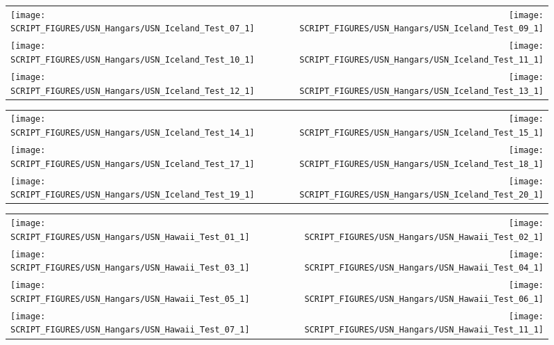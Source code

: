 \begin{figure}[!ht]
\begin{tabular*}{\textwidth}{l@{\extracolsep{\fill}}r}
\texttt{[image: SCRIPT\_FIGURES/USN\_Hangars/USN\_Iceland\_Test\_07\_1]} &
\texttt{[image: SCRIPT\_FIGURES/USN\_Hangars/USN\_Iceland\_Test\_09\_1]} \\
\texttt{[image: SCRIPT\_FIGURES/USN\_Hangars/USN\_Iceland\_Test\_10\_1]} &
\texttt{[image: SCRIPT\_FIGURES/USN\_Hangars/USN\_Iceland\_Test\_11\_1]} \\
\texttt{[image: SCRIPT\_FIGURES/USN\_Hangars/USN\_Iceland\_Test\_12\_1]} &
\texttt{[image: SCRIPT\_FIGURES/USN\_Hangars/USN\_Iceland\_Test\_13\_1]} \\
\end{tabular*}
\label{USN_Plume_Iceland_2}
\end{figure}

\begin{figure}[!ht]
\begin{tabular*}{\textwidth}{l@{\extracolsep{\fill}}r}
\texttt{[image: SCRIPT\_FIGURES/USN\_Hangars/USN\_Iceland\_Test\_14\_1]} &
\texttt{[image: SCRIPT\_FIGURES/USN\_Hangars/USN\_Iceland\_Test\_15\_1]} \\
\texttt{[image: SCRIPT\_FIGURES/USN\_Hangars/USN\_Iceland\_Test\_17\_1]} &
\texttt{[image: SCRIPT\_FIGURES/USN\_Hangars/USN\_Iceland\_Test\_18\_1]} \\
\texttt{[image: SCRIPT\_FIGURES/USN\_Hangars/USN\_Iceland\_Test\_19\_1]} &
\texttt{[image: SCRIPT\_FIGURES/USN\_Hangars/USN\_Iceland\_Test\_20\_1]} \\
\end{tabular*}
\label{USN_Plume_Iceland_3}
\end{figure}

\begin{figure}[!ht]
\begin{tabular*}{\textwidth}{l@{\extracolsep{\fill}}r}
\texttt{[image: SCRIPT\_FIGURES/USN\_Hangars/USN\_Hawaii\_Test\_01\_1]} &
\texttt{[image: SCRIPT\_FIGURES/USN\_Hangars/USN\_Hawaii\_Test\_02\_1]} \\
\texttt{[image: SCRIPT\_FIGURES/USN\_Hangars/USN\_Hawaii\_Test\_03\_1]} &
\texttt{[image: SCRIPT\_FIGURES/USN\_Hangars/USN\_Hawaii\_Test\_04\_1]} \\
\texttt{[image: SCRIPT\_FIGURES/USN\_Hangars/USN\_Hawaii\_Test\_05\_1]} &
\texttt{[image: SCRIPT\_FIGURES/USN\_Hangars/USN\_Hawaii\_Test\_06\_1]} \\
\texttt{[image: SCRIPT\_FIGURES/USN\_Hangars/USN\_Hawaii\_Test\_07\_1]} &
\texttt{[image: SCRIPT\_FIGURES/USN\_Hangars/USN\_Hawaii\_Test\_11\_1]}
\end{tabular*}
\label{USN_Plume_Hawaii}
\end{figure}

